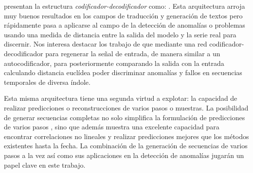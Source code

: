 \citeauthor{Cho2014} presentan la estructura \textit{codificador-decodificador} como: . Esta arquitectura arroja muy buenos resultados en los campos de traducción y generación de textos \cite{Cho2014,cho2014b,Serban2017,Tran2017} pero rápidamente pasa a aplicarse al campo de la detección de anomalías o problemas usando una medida de distancia entre la salida del modelo y la serie real para discernir\cite{Wang2018,malhotra2016,Park2018,Wang2020}. Nos interesa destacar los trabajo de  que mediante una red codificador-decodificador para regenerar la señal de entrada, de manera similar a un autocodificador, para posteriormente comparando la salida con la entrada calculando distancia euclídea poder discriminar anomalías y fallos en secuencias temporales de diversa índole.

  Esta misma arquitectura tiene una segunda virtud a explotar: la capacidad de realizar predicciones o reconstrucciones de varios pasos o muestras\cite{Peng2018}. La posibilidad de generar secuencias completas no solo simplifica la formulación de predicciones de varios pasos \cite{Kao2020}, sino que además muestra una excelente capacidad para encontrar correlaciones no lineales y realizar predicciones mejores que los métodos existentes hasta la fecha\cite{Peng2018,Du2019,Kao2020}. La combinación de la generación de secuencias de varios pasos a la vez así como sus aplicaciones en la detección de anomalías jugarán un papel clave en este trabajo.



